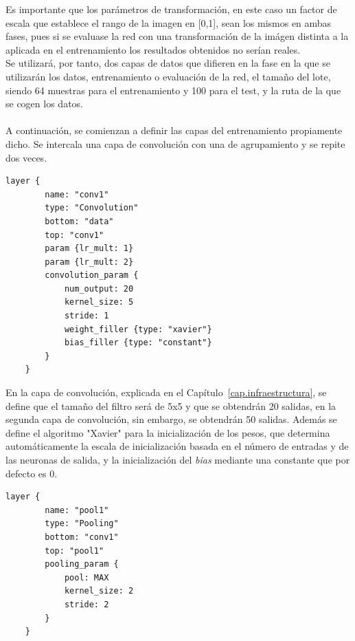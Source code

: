 \begin{description}
	Es importante que los parámetros de transformación, en este caso un factor de escala que establece el rango de la imagen en [0,1], sean los mismos en ambas fases, pues si se evaluase la red con una transformación de la imágen distinta a la aplicada en el entrenamiento los resultados obtenidos no serían reales.\\
	Se utilizará, por tanto, dos capas de datos que difieren en la fase en la que se utilizarán los datos, entrenamiento o evaluación de la red, el tamaño del lote, siendo 64 muestras para el entrenamiento y 100 para el test, y la ruta de la que se cogen los datos.\\
	\vspace{-10pt}
	\\
	A continuación, se comienzan a definir las capas del entrenamiento propiamente dicho. Se intercala una capa de convolución con una de agrupamiento y se repite dos veces.
	\vspace{10pt}
	\begin{lstlisting}[frame=single]
	layer {
		name: "conv1"
		type: "Convolution"
		bottom: "data"
		top: "conv1"
		param {lr_mult: 1}
		param {lr_mult: 2}
		convolution_param {
			num_output: 20
			kernel_size: 5
			stride: 1
			weight_filler {type: "xavier"}
			bias_filler {type: "constant"}
		}
	}	
	\end{lstlisting}

	En la capa de convolución, explicada en el Capítulo~\ref{cap.infraestructura}, se define que el tamaño del filtro será de 5x5 y que se obtendrán 20 salidas, en la segunda capa de convolución, sin embargo, se obtendrán 50 salidas. Además se define el algoritmo "Xavier" para la inicialización de los pesos, que determina automáticamente la escala de inicialización basada en el número de entradas y de las neuronas de salida, y la inicialización del \textit{bias} mediante una constante que por defecto es 0.
	\vspace{10pt}
	\begin{lstlisting}[frame=single]
	layer {
		name: "pool1"
		type: "Pooling"
		bottom: "conv1"
		top: "pool1"
		pooling_param {
			pool: MAX
			kernel_size: 2
			stride: 2
		}
	}	
	\end{lstlisting}
	

\end{description}
